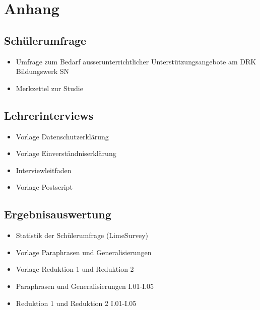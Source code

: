 \listoffigures

\newpage

\section{Anhang}
\label{sec:Anhang}

\subsection{Schülerumfrage}
\label{sec:Schülerumfrage}

\begin{itemize}
	\item Umfrage zum Bedarf ausserunterrichtlicher Unterstützungsangebote am DRK Bildungswerk SN 
	\item Merkzettel zur Studie 
\end{itemize}




\subsection{Lehrerinterviews}
\label{sec:Lehrerinterviews}

\begin{itemize}
	\item Vorlage Datenschutzerklärung
	\item Vorlage Einverständniserklärung
	\item Interviewleitfaden
	\item Vorlage Postscript
\end{itemize}






\subsection{Ergebnisauswertung}
\label{sec:Ergebnisauswertung}

	\begin{itemize}
	\item Statistik der Schülerumfrage (LimeSurvey)
	\item Vorlage Paraphrasen und Generalisierungen
	\item Vorlage Reduktion 1 und Reduktion 2
	\item Paraphrasen und Generalisierungen I.01-I.05
	\item Reduktion 1 und Reduktion 2 I.01-I.05
	\end{itemize}
	
